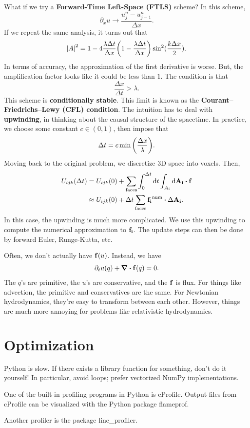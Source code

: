 \documentclass[12pt,letterpaper]{article}
\begin{document}
What if we try a \textbf{Forward-Time Left-Space (FTLS)} scheme? In this scheme,
\[\partial_xu\to\frac{u_j^n-u_{j-1}^n}{\Delta x}.\]
If we repeat the same analysis, it turns out that
\[\abs{A}^2=1-4\frac{\lambda\Delta t}{\Delta x}\qty(1-\frac{\lambda\Delta t}{\Delta x})\sin^2(\frac{k\Delta x}{2}).\]
In terms of accuracy, the approximation of the first derivative is worse. But, the amplification factor looks like it could be less than $1$. The condition is that
\[\boxed{\frac{\Delta x}{\Delta t}>\lambda}.\]
This scheme is \textbf{conditionally stable}. This limit is known as the \textbf{Courant–Friedrichs–Lewy (CFL) condition}. The intuition has to deal with \textbf{upwinding}, in thinking about the causal structure of the spacetime. In practice, we choose some constant $c\in(0,1)$, then impose that
\[\Delta t=c\min\qty(\frac{\Delta x}{\lambda}).\]
Moving back to the original problem, we discretize 3D space into voxels. Then,
\begin{align*}
    U_{ijk}(\Delta t)&=U_{ijk}(0)+\sum_{\text{faces}}\int_0^{\Delta t}\dd{t}\int_{A_i}\dd{\vb{A_i}}\vdot\vb{f}\\
    &\approx U_{ijk}(0)+\Delta t\sum_{\text{faces}}\vb{f_i}^{\mathrm{num}}\vdot\Delta\vb{A_i}.
\end{align*}
In this case, the upwinding is much more complicated. We use this upwinding to compute the numerical approximation to $\vb{f_i}$. The update steps can then be done by forward Euler, Runge-Kutta, etc.

Often, we don't actually have $\vb{f}(u)$. Instead, we have
\[\partial_tu(q)+\div{\vb{f}(q)}=0.\]
The $q$'s are primitive, the $u$'s are conservative, and the $\vb f$ is flux. For things like advection, the primitive and conservatives are the same. For Newtonian hydrodynamics, they're easy to transform between each other. However, things are much more annoying for problems like relativistic hydrodynamics.

\section{Optimization}
Python is slow. If there exists a library function for something, don't do it yourself! In particular, avoid loops; prefer vectorized NumPy implementations.

One of the built-in profiling programs in Python is cProfile. Output files from cProfile can be visualized with the Python package flameprof.

Another profiler is the package line\_profiler.
\end{document}

